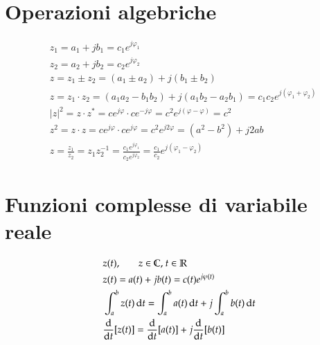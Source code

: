 \section{Operazioni algebriche}
\begin{align*}
 & z_1=a_1+jb_1=c_1e^{j\varphi_1}\\
 & z_2=a_2+jb_2=c_2e^{j\varphi_2}\\
 & z=z_1\pm z_2=(a_1\pm a_2)+j(b_1\pm b_2)\\
 & z=z_1\cdot z_2=(a_1a_2-b_1b_2)+j(a_1b_2-a_2b_1)=c_1c_2e^{j(\varphi_1+\varphi_2)}\\
 & |z|^2=z\cdot z^*=ce^{j\varphi}\cdot ce^{-j\varphi}=c^2e^{j(\varphi-\varphi)}=c^2\\
 & z^2=z\cdot z=ce^{j\varphi}\cdot ce^{j\varphi}=c^2e^{j2\varphi}=(a^2-b^2)+j2ab\\
 & z=\frac{z_1}{z_2}=z_1z_2^{-1}=\frac{c_1e^{j\varphi_1}}{c_2e^{j\varphi_2}}=\frac{c_1}{c_2}e^{j(\varphi_1-\varphi_2)}
\end{align*}

\section{Funzioni complesse di variabile reale}
\begin{align*}
 & z(t)\text{,}\qquad z\in\mathbb{C}\text{, }t\in\mathbb{R}\\
 & z(t)=a(t)+jb(t)=c(t)e^{j\varphi(t)}\\
 & \int_a^b z(t)\ud t=\int_a^b a(t)\ud t+j\int_a^b b(t)\ud t\\
 & \frac{\ud}{\ud t}[z(t)]=\frac{\ud}{\ud t}[a(t)] + j\frac{\ud}{\ud t}[b(t)]
\end{align*}





